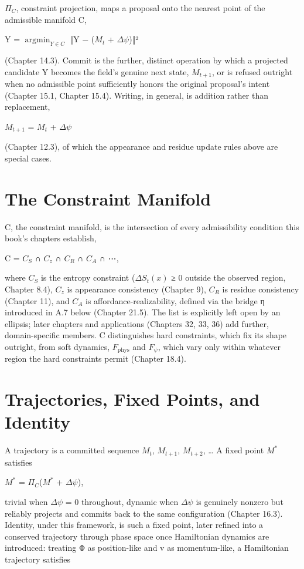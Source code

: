 \(\Pi_C\), constraint projection, maps a proposal onto the nearest point of the admissible manifold C,

Y = \(\operatorname*{argmin}_{Y \in C}\) ‖Y − (\(M_t\) + \(\Delta\psi\))‖²

(Chapter 14.3). Commit is the further, distinct operation by which a projected candidate Y becomes the field's genuine next state, \(M_{t+1}\), or is refused outright when no admissible point sufficiently honors the original proposal's intent (Chapter 15.1, Chapter 15.4). Writing, in general, is addition rather than replacement,

\(M_{t+1}\) = \(M_t\) + \(\Delta\psi\)

(Chapter 12.3), of which the appearance and residue update rules above are special cases.

\section{The Constraint Manifold}

C, the constraint manifold, is the intersection of every admissibility condition this book's chapters establish,

C = \(C_S\) ∩ \(C_z\) ∩ \(C_R\) ∩ \(C_A\) ∩ ⋯,

where \(C_S\) is the entropy constraint (\(\Delta S_t(x)\) ≥ 0 outside the observed region, Chapter 8.4), \(C_z\) is appearance consistency (Chapter 9), \(C_R\) is residue consistency (Chapter 11), and \(C_A\) is affordance-realizability, defined via the bridge η introduced in A.7 below (Chapter 21.5). The list is explicitly left open by an ellipsis; later chapters and applications (Chapters 32, 33, 36) add further, domain-specific members. C distinguishes hard constraints, which fix its shape outright, from soft dynamics, \(F_{\mathrm{phys}}\) and \(F_\psi\), which vary only within whatever region the hard constraints permit (Chapter 18.4).

\section{Trajectories, Fixed Points, and Identity}

A trajectory is a committed sequence \(M_t\), \(M_{t+1}\), \(M_{t+2}\), … A fixed point \(M^*\) satisfies

\(M^*\) = \(\Pi_C\)(\(M^*\) + \(\Delta\psi\)),

trivial when \(\Delta\psi\) = 0 throughout, dynamic when \(\Delta\psi\) is genuinely nonzero but reliably projects and commits back to the same configuration (Chapter 16.3). Identity, under this framework, is such a fixed point, later refined into a conserved trajectory through phase space once Hamiltonian dynamics are introduced: treating Φ as position-like and v as momentum-like, a Hamiltonian trajectory satisfies

